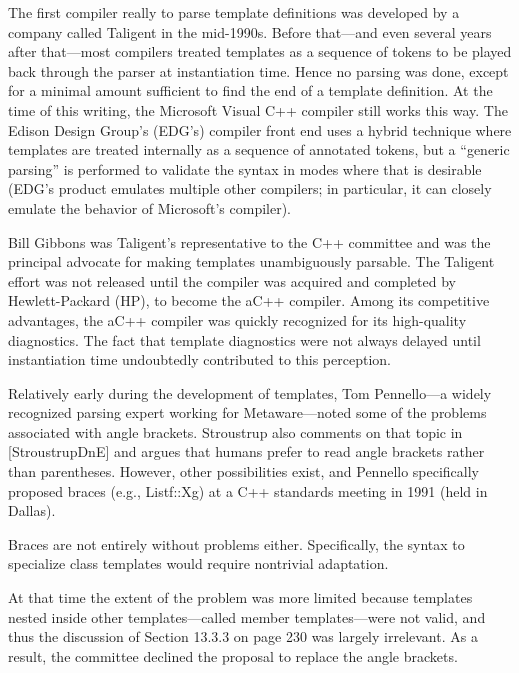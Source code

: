 The first compiler really to parse template definitions was developed by a company called Taligent in the mid-1990s. Before that—and even several years after that—most compilers treated templates as a sequence of tokens to be played back through the parser at instantiation time. Hence no parsing was done, except for a minimal amount sufficient to find the end of a template definition. At the time of this writing, the Microsoft Visual C++ compiler still works this way. The Edison Design Group’s (EDG’s) compiler front end uses a hybrid technique where templates are treated internally as a sequence of annotated tokens, but a “generic parsing” is performed to validate the syntax in modes where that is desirable (EDG’s product emulates multiple other compilers; in particular, it can closely emulate the behavior of Microsoft’s compiler).

Bill Gibbons was Taligent’s representative to the C++ committee and was the principal advocate for making templates unambiguously parsable. The Taligent effort was not released until the compiler was acquired and completed by Hewlett-Packard (HP), to become the aC++ compiler. Among its competitive advantages, the aC++ compiler was quickly recognized for its high-quality diagnostics. The fact that template diagnostics were not always delayed until instantiation time undoubtedly contributed to this perception.

Relatively early during the development of templates, Tom Pennello—a widely recognized parsing expert working for Metaware—noted some of the problems associated with angle brackets. Stroustrup also comments on that topic in [StroustrupDnE] and argues that humans prefer to read angle brackets rather than parentheses. However, other possibilities exist, and Pennello specifically proposed braces (e.g., Listf::Xg) at a C++ standards meeting in 1991 (held in Dallas).

\begin{tcolorbox}[colback=webgreen!5!white,colframe=webgreen!75!black]
\hspace*{0.75cm}Braces are not entirely without problems either. Specifically, the syntax to specialize class templates would require nontrivial adaptation.
\end{tcolorbox}

At that time the extent of the problem was more limited because templates nested inside other templates—called member templates—were not valid, and thus the discussion of Section 13.3.3 on page 230 was largely irrelevant. As a result, the committee declined the proposal to replace the angle brackets.

